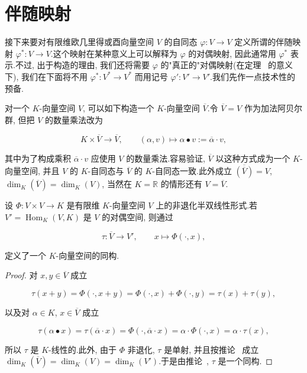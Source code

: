 \section{伴随映射}\label{sec:7.4}

接下来要对有限维欧几里得或酉向量空间 $V$ 的自同态 $\varphi \colon V \longrightarrow V$ 定义所谓的伴随映射 $\varphi^* \colon V \longrightarrow V$.这个映射在某种意义上可以解释为 $\varphi$ 的对偶映射, 因此通常用 $\varphi^*$ 表示.不过, 出于构造的理由, 我们还将需要 $\varphi$ 的"真正的"对偶映射(在定理~ 的意义下), 我们在下面将不用 $\varphi^* \colon V^* \longrightarrow V^*$ 而用记号 $\varphi' \colon V' \longrightarrow V'$.我们先作一点技术性的预备.

对一个 $K$-向量空间 $V$, 可以如下构造一个 $K$-向量空间 $\overline{V}$.令 $\overline{V} = V$ 作为加法阿贝尔群, 但把 $V$ 的数量乘法改为

\[
K \times \overline{V} \longrightarrow \overline{V}, \qquad (\alpha, v) \longmapsto \alpha \bullet v := \overline{\alpha} \cdot v,
\]

其中为了构成乘积 $\overline{\alpha} \cdot v$ 应使用 $V$ 的数量乘法.容易验证, $\overline{V}$ 以这种方式成为一个 $K$-向量空间, 并且 $V$ 的 $K$-自同态与 $\overline{V}$ 的 $K$-自同态一致.此外成立 $\overline{(\overline{V})} = V$, $\dim_K(\overline{V}) = \dim_K(V)$, 当然在 $K = \mathbb{R}$ 的情形还有 $V = \overline{V}$.

\begin{lemma}\label{lem:7.4.1}
设 $\varPhi \colon V \times V \longrightarrow K$ 是有限维 $K$-向量空间 $V$ 上的非退化半双线性形式.若 $V' = \operatorname{Hom}_K(V, K)$ 是 $V$ 的对偶空间, 则通过

\[
\tau \colon \overline{V} \longrightarrow V', \qquad x \longmapsto \varPhi(\cdot, x),
\]

定义了一个 $K$-向量空间的同构.
\end{lemma}

\begin{proof}
对 $x, y \in \overline{V}$ 成立

\[
\tau(x + y) = \varPhi(\cdot, x + y) = \varPhi(\cdot, x) + \varPhi(\cdot, y) = \tau(x) + \tau(y),
\]

以及对 $\alpha \in K$, $x \in \overline{V}$ 成立

\[
\tau(\alpha \bullet x) = \tau(\overline{\alpha} \cdot x) = \varPhi(\cdot, \overline{\alpha} \cdot x) = \alpha \cdot \varPhi(\cdot, x) = \alpha \cdot \tau(x),
\]

所以 $\tau$ 是 $K$-线性的.此外, 由于 $\varPhi$ 非退化, $\tau$ 是单射, 并且按推论~ 成立 $\dim_K(\overline{V}) = \dim_K(V) = \dim_K(V')$.于是由推论~, $\tau$ 是一个同构.
\end{proof}

